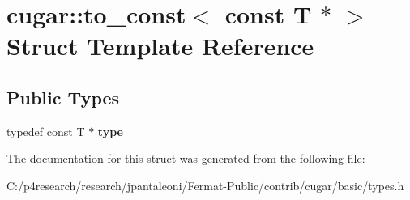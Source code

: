 \hypertarget{structcugar_1_1to__const_3_01const_01_t_01_5_01_4}{}\section{cugar\+:\+:to\+\_\+const$<$ const T $\ast$ $>$ Struct Template Reference}
\label{structcugar_1_1to__const_3_01const_01_t_01_5_01_4}
\subsection*{Public Types}
\begin{DoxyCompactItemize}
\item 
\mbox{\label{structcugar_1_1to__const_3_01const_01_t_01_5_01_4_ad370b2b7f44a0ed1bf75bf804b50ba92}} 
typedef const T $\ast$ {\bfseries type}
\end{DoxyCompactItemize}


The documentation for this struct was generated from the following file\+:\begin{DoxyCompactItemize}
\item 
C\+:/p4research/research/jpantaleoni/\+Fermat-\/\+Public/contrib/cugar/basic/types.\+h\end{DoxyCompactItemize}
